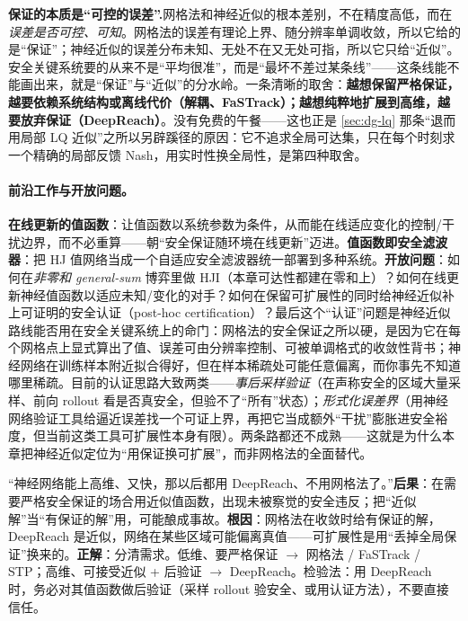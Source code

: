 \begin{insight}
\textbf{保证的本质是“可控的误差”.}\;网格法和神经近似的根本差别，不在精度高低，而在\emph{误差是否可控、可知}。网格法的误差有理论上界、随分辨率单调收敛，所以它给的是“保证”；神经近似的误差分布未知、无处不在又无处可指，所以它只给“近似”。安全关键系统要的从来不是“平均很准”，而是“最坏不差过某条线”——这条线能不能画出来，就是“保证”与“近似”的分水岭。一条清晰的取舍：\textbf{越想保留严格保证，越要依赖系统结构或离线代价（解耦、FaSTrack）；越想纯粹地扩展到高维，越要放弃保证（DeepReach）}。没有免费的午餐——这也正是 \cref{sec:dg-lq} 那条“退而用局部 LQ 近似”之所以另辟蹊径的原因：它不追求全局可达集，只在每个时刻求一个精确的局部反馈 Nash，用实时性换全局性，是第四种取舍。
\end{insight}

\paragraph{前沿工作与开放问题。}
\textbf{在线更新的值函数}：让值函数以系统参数为条件，从而能在线适应变化的控制/干扰边界，而不必重算——朝“安全保证随环境在线更新”迈进。\textbf{值函数即安全滤波器}：把 HJ 值网络当成一个自适应安全滤波器统一部署到多种系统。\textbf{开放问题}：如何在\emph{非零和 general-sum} 博弈里做 HJI（本章可达性都建在零和上）？如何在线更新神经值函数以适应未知/变化的对手？如何在保留可扩展性的同时给神经近似补上可证明的安全认证（post-hoc certification）？最后这个“认证”问题是神经近似路线能否用在安全关键系统上的命门：网格法的安全保证之所以硬，是因为它在每个网格点上显式算出了值、误差可由分辨率控制、可被单调格式的收敛性背书；神经网络在训练样本附近拟合得好，但在样本稀疏处可能任意偏离，而你事先不知道哪里稀疏。目前的认证思路大致两类——\emph{事后采样验证}（在声称安全的区域大量采样、前向 rollout 看是否真安全，但验不了“所有”状态）；\emph{形式化误差界}（用神经网络验证工具给逼近误差找一个可证上界，再把它当成额外“干扰”膨胀进安全裕度，但当前这类工具可扩展性本身有限）。两条路都还不成熟——这就是为什么本章把神经近似定位为“用保证换可扩展”，而非网格法的全面替代。

\begin{pitfall}
“神经网络能上高维、又快，那以后都用 DeepReach、不用网格法了。”\textbf{后果}：在需要严格安全保证的场合用近似值函数，出现未被察觉的安全违反；把“近似解”当“有保证的解”用，可能酿成事故。\textbf{根因}：网格法在收敛时给有保证的解，DeepReach 是近似，网络在某些区域可能偏离真值——可扩展性是用“丢掉全局保证”换来的。\textbf{正解}：分清需求。低维、要严格保证 $\to$ 网格法 / FaSTrack / STP；高维、可接受近似 + 后验证 $\to$ DeepReach。检验法：用 DeepReach 时，务必对其值函数做后验证（采样 rollout 验安全、或用认证方法），不要直接信任。
\end{pitfall}

